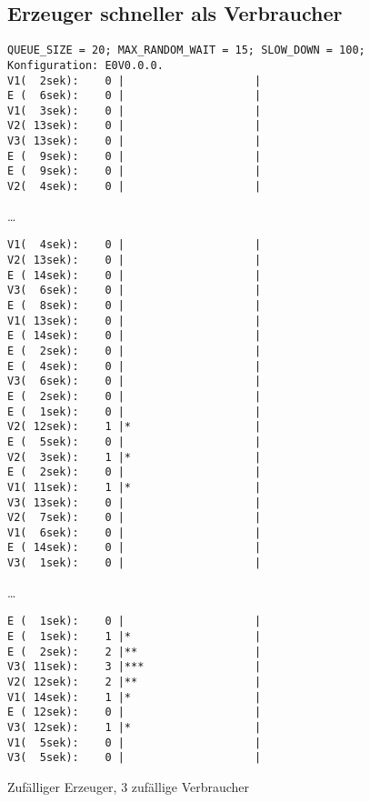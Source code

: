 \subsection{Erzeuger schneller als Verbraucher} %
\begin{ausgabe}[H]
\begin{scriptsize}
\begin{spacing}{1.0}
\begin{verbatim}
QUEUE_SIZE = 20; MAX_RANDOM_WAIT = 15; SLOW_DOWN = 100;
Konfiguration: E0V0.0.0.
V1(  2sek):    0 |                    |
E (  6sek):    0 |                    |
V1(  3sek):    0 |                    |
V2( 13sek):    0 |                    |
V3( 13sek):    0 |                    |
E (  9sek):    0 |                    |
E (  9sek):    0 |                    |
V2(  4sek):    0 |                    |
\end{verbatim}

…

\begin{verbatim}
V1(  4sek):    0 |                    |
V2( 13sek):    0 |                    |
E ( 14sek):    0 |                    |
V3(  6sek):    0 |                    |
E (  8sek):    0 |                    |
V1( 13sek):    0 |                    |
E ( 14sek):    0 |                    |
E (  2sek):    0 |                    |
E (  4sek):    0 |                    |
V3(  6sek):    0 |                    |
E (  2sek):    0 |                    |
E (  1sek):    0 |                    |
V2( 12sek):    1 |*                   |
E (  5sek):    0 |                    |
V2(  3sek):    1 |*                   |
E (  2sek):    0 |                    |
V1( 11sek):    1 |*                   |
V3( 13sek):    0 |                    |
V2(  7sek):    0 |                    |
V1(  6sek):    0 |                    |
E ( 14sek):    0 |                    |
V3(  1sek):    0 |                    |
\end{verbatim}

…

\begin{verbatim}
E (  1sek):    0 |                    |
E (  1sek):    1 |*                   |
E (  2sek):    2 |**                  |
V3( 11sek):    3 |***                 |
V2( 12sek):    2 |**                  |
V1( 14sek):    1 |*                   |
E ( 12sek):    0 |                    |
V3( 12sek):    1 |*                   |
V1(  5sek):    0 |                    |
V3(  5sek):    0 |                    |
\end{verbatim}
\caption{Zufälliger Erzeuger, 3 zufällige Verbraucher}
\label{out:esv}
\end{spacing}
\end{scriptsize}
\end{ausgabe}

